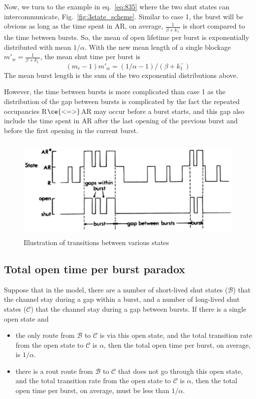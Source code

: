 Now, we turn to the example in eq.~\eqref{eq:835} where the two shut
states can intercommunicate, Fig.~\ref{fig:3state_scheme}. Similar to
case 1, the burst will be obvious as long as the time spent in AR, on
average, $\frac{1}{\beta+k_1^-}$ is short compared to the time between
bursts. So, the mean of open lifetime per burst is exponentially
distributed with mean $1/\alpha$. With the new mean length of a single
blockage $m'_w =\frac{1}{\beta+k^-_1}$, the mean shut time per burst
is
\begin{equation}
  \label{eq:914}
  (m_r-1)m'_w = (1/\alpha-1)/(\beta+k^-_1)
\end{equation}
The mean burst length is the sum of the two exponential distributions
above.

However, the time between bursts is more complicated than case
1 as the distribution of the gap between bursts is complicated by the
fact the repeated occupancies R$\ce{<=>}$AR may occur before a burst
starts, and this gap also include the time spent in AR after the last
opening of the previous burst and before the first opening in the
current burst.

\begin{figure}[hbt]
  \centerline{\includegraphics[height=5cm,
    angle=0]{./images/3_state.eps}}
\caption{Illustration of transitions between various states}
\label{fig:3_state}
\end{figure}


\subsection{Total open time per burst paradox}
\label{sec:total-open-time}

Suppose that in the model, there are a number of short-lived shut
states ($\mathcal{B}$) that the channel stay during a gap within a
burst, and a number of long-lived shut states ($\mathcal{C}$) that the
channel stay during a gap between bursts. If there is a single open
state and
\begin{itemize}
\item the only route from $\mathcal{B}$ to $\mathcal{C}$ is via this
  open state, and the total transition rate from the open state to
  $\mathcal{C}$ is $\alpha$, then the total open time per burst, on
  average, is $1/\alpha$.
\item there is a rout route from $\mathcal{B}$ to $\mathcal{C}$ that
  does not go through this open state, and the total transition rate
  from the open state to $\mathcal{C}$ is $\alpha$, then the total
  open time per burst, on average, must be less than $1/\alpha$.
\end{itemize}

